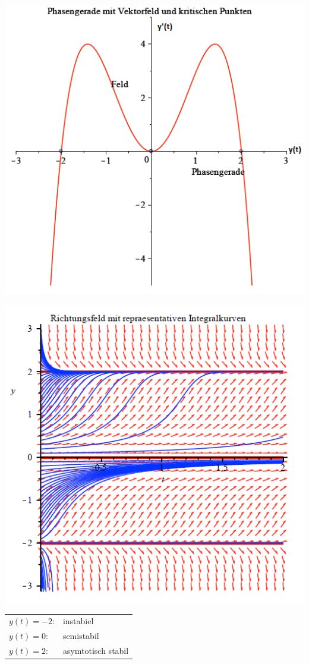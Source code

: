 \begin{minipage}[h]{0.35\textwidth} 
	\includegraphics[width=1.0\textwidth]{images/Phasengerade.png}
\end{minipage}
\begin{minipage}[h]{0.35\textwidth}
	\includegraphics[width=1.0\textwidth]{images/Richtungsfeld.png}
\end{minipage}
\begin{tabular}{p{1.8cm}p{5cm}}
	$y(t) = -2$: & instabiel \\
	$y(t) = 0$: & semistabil\\
	$y(t) = 2$: & asymtotisch stabil\\
\end{tabular}

